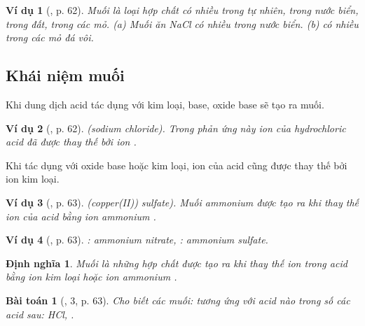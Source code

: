 \documentclass{article}
\newtheorem{baitoan}{Bài toán}
\newtheorem{dinhnghia}{Định nghĩa}
\newtheorem{vidu}{Ví dụ}
\begin{document}
\begin{vidu}[\cite{SGK_KHTN_8_Canh_Dieu}, p. 62]
	Muối là loại hợp chất có nhiều trong tự nhiên, trong nước biển, trong đất, trong các mỏ. (a) Muối ăn \emph{NaCl} có nhiều trong nước biển. (b) \emph{} có nhiều trong các mỏ đá vôi.
\end{vidu}

\subsection{Khái niệm muối}
Khi dung dịch acid tác dụng với kim loại, base, oxide base sẽ tạo ra muối.

\begin{vidu}[\cite{SGK_KHTN_8_Canh_Dieu}, p. 62]
	\emph{} (sodium chloride). Trong phản ứng này ion \emph{} của hydrochloric acid đã được thay thế bởi ion \emph{}.
\end{vidu}
Khi tác dụng với oxide base hoặc kim loại, ion  của acid cũng được thay thế bởi ion kim loại.

\begin{vidu}[\cite{SGK_KHTN_8_Canh_Dieu}, p. 63]
	\emph{} (copper(II)) sulfate). Muối ammonium được tạo ra khi thay thế ion \emph{} của acid bằng ion ammonium \emph{}.
\end{vidu}

\begin{vidu}[\cite{SGK_KHTN_8_Canh_Dieu}, p. 63]
	\emph{}: ammonium nitrate, \emph{}: ammonium sulfate.
\end{vidu}

\begin{dinhnghia}
	\emph{Muối} là những hợp chất được tạo ra khi thay thế ion \emph{} trong acid bằng ion kim loại hoặc ion ammonium \emph{}.
\end{dinhnghia}

\begin{baitoan}[\cite{SGK_KHTN_8_Canh_Dieu}, 3, p. 63]
	Cho biết các muối: \emph{} tương ứng với acid nào trong số các acid sau: \emph{HCl, }.
\end{baitoan}
\end{document}
